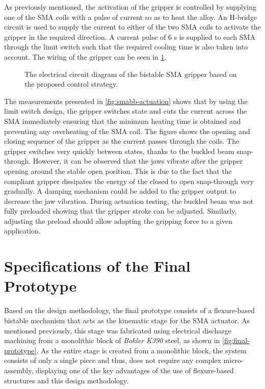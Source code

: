 As previously mentioned, the activation of the gripper is controlled by supplying one of the SMA coils with a pulse of current so as to heat the alloy. An H-bridge circuit is used to supply the current to either of the two SMA coils to activate the gripper in the required direction. A current pulse of $6$ s is supplied to each SMA through the limit switch such that the required cooling time is also taken into account. The wiring of the gripper can be seen in \cref{fig:smabb-circuit}.

\begin{figure}[hbt!] %
  \centering
  
  \caption{The electrical circuit diagram of the bistable SMA gripper based on the proposed control strategy.}
  \label{fig:smabb-circuit}
\end{figure}

The measurements presented in \cref{fig:smabb-actuation} shows that by using the limit switch design, the gripper switches state and cuts the current across the SMA immediately ensuring that the minimum heating time is obtained and preventing any overheating of the SMA coil. The figure shows the opening and closing sequence of the gripper as the current passes through the coils. The gripper switches very quickly between states, thanks to the buckled beam snap-through. However, it can be observed that the jaws vibrate after the gripper opening around the stable open position. This is due to the fact that the compliant gripper dissipates the energy of the closed to open snap-through very gradually. A damping mechanism could be added to the gripper output to decrease the jaw vibration. During actuation testing, the buckled beam was not fully preloaded showing that the gripper stroke can be adjusted. Similarly, adjusting the preload should allow adapting the gripping force to a given application.

\section{Specifications of the Final Prototype}
Based on the design methodology, the final prototype consists of a flexure-based bistable mechanism that acts as the kinematic stage for the SMA actuator. As mentioned previously, this stage was fabricated using electrical discharge machining from a monolithic block of \textit{Bohler K390} steel, as shown in \cref{fig:final-prototype}. As the entire stage is created from a monolithic block, the system consists of only a single piece and thus, does not require any complex micro-assembly, displaying one of the key advantages of the use of flexure-based structures and this design methodology.

